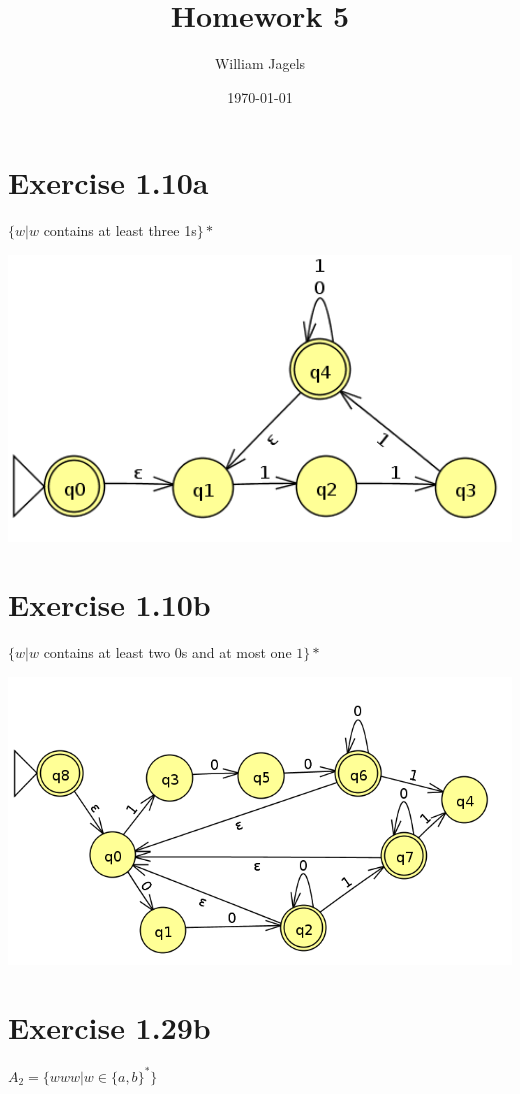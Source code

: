 \documentclass[a4paper,12pt]{article}
\title{Homework 5}
\author{William Jagels}
\date{\today}
\begin{document}
\maketitle

\section{Exercise 1.10a}
$\{w| w$ contains at least three 1s$\}*$

\includegraphics[width=15cm]{q1}

\section{Exercise 1.10b}
$\{w| w$ contains at least two $0$s and at most one $1\}*$

\includegraphics[width=15cm]{q2}

\section{Exercise 1.29b}
$A_2 = \{www| w \in \{a, b\}^*\}$
\end{document}
